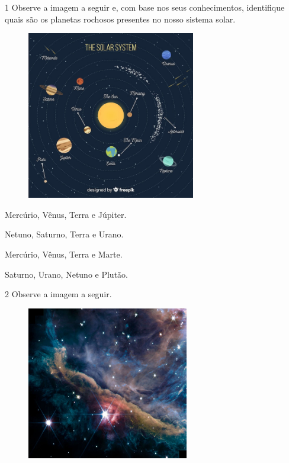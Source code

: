\num{1} Observe a imagem a seguir e, com base nos seus conhecimentos, identifique quais são os planetas rochosos presentes no nosso sistema solar.

\begin{figure}[htpb!]
\includegraphics[width=2.89583in,height=2.89583in]{./imgs/img12.jpg}
\end{figure}

\begin{escolha}
\item
  Mercúrio, Vênus, Terra e Júpiter.
\item
  Netuno, Saturno, Terra e Urano.
\item
  Mercúrio, Vênus, Terra e Marte.
\item
  Saturno, Urano, Netuno e Plutão.
\end{escolha}

\num{2} Observe a imagem a seguir.

\begin{figure}[htpb!]
\includegraphics[width=2.77865in,height=2.63750in]{./imgs/img13.jpg}
\end{figure}

